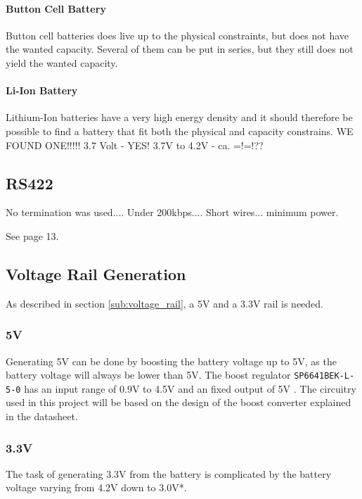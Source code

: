 \paragraph{Button Cell Battery}
Button cell batteries does live up to the physical constraints, but does not have the wanted capacity. 
Several of them can be put in series, but they still does not yield the wanted capacity.

\paragraph{Li-Ion Battery}
Lithium-Ion batteries have a very high energy density and it should therefore be possible to find a battery that fit both the physical and capacity constrains.
WE FOUND ONE!!!!!
3.7 Volt - YES!
3.7V to 4.2V - ca. =!=!??

\subsection{RS422}
No termination was used....
Under 200kbps....
Short wires...
minimum power.

See \cite{rs422_texas} page 13.

\subsection{Voltage Rail Generation}
\label{sub:voltage_rail_generation}
As described in section \ref{sub:voltage_rail}, a 5V and a 3.3V rail is needed. 

\subsubsection*{5V}
Generating 5V can be done by boosting the battery voltage up to 5V, as the battery voltage will always be lower than 5V.
The boost regulator \texttt{SP6641BEK-L-5-0} has an input range of 0.9V to 4.5V and an fixed output of 5V \cite{sp6641b}.
The circuitry used in this project will be based on the design of the boost converter explained in the datasheet.

\subsubsection*{3.3V}
The task of generating 3.3V from the battery is complicated by the battery voltage varying from 4.2V down to 3.0V*.

